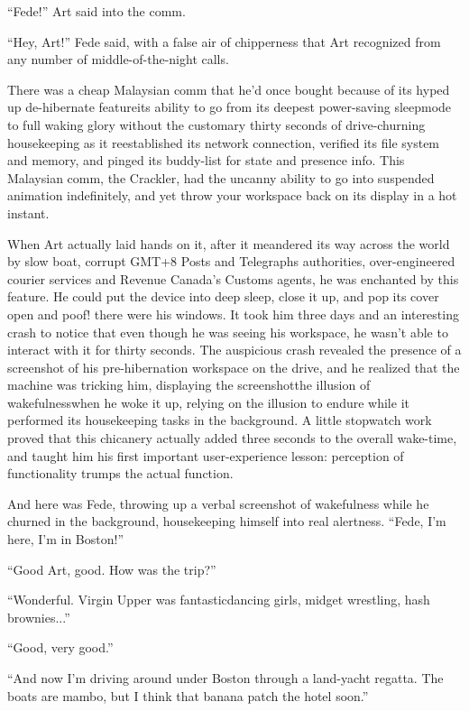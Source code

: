 “Fede!” Art said into the comm.

“Hey, Art!” Fede said, with a false air of chipperness that Art
recognized from any number of middle-of-the-night calls.

There was a cheap Malaysian comm that he’d once bought because of
its hyped up de-hibernate feature{\dash}its ability to go from its
deepest power-saving sleepmode to full waking glory without the
customary thirty seconds of drive-churning housekeeping as it
reestablished its network connection, verified its file system and
memory, and pinged its buddy-list for state and presence info. This
Malaysian comm, the Crackler, had the uncanny ability to go into
suspended animation indefinitely, and yet throw your workspace back
on its display in a hot instant.

When Art actually laid hands on it, after it meandered its way
across the world by slow boat, corrupt GMT+8 Posts and Telegraphs
authorities, over-engineered courier services and Revenue Canada’s
Customs agents, he was enchanted by this feature. He could put the
device into deep sleep, close it up, and pop its cover open and
poof! there were his windows. It took him three days and an
interesting crash to notice that even though he was seeing his
workspace, he wasn’t able to interact with it for thirty seconds.
The auspicious crash revealed the presence of a screenshot of his
pre-hibernation workspace on the drive, and he realized that the
machine was tricking him, displaying the screenshot{\dash}the illusion of
wakefulness{\dash}when he woke it up, relying on the illusion to endure
while it performed its housekeeping tasks in the background. A
little stopwatch work proved that this chicanery actually added
three seconds to the overall wake-time, and taught him his first
important user-experience lesson: perception of functionality
trumps the actual function.

And here was Fede, throwing up a verbal screenshot of wakefulness
while he churned in the background, housekeeping himself into real
alertness. “Fede, I’m here, I’m in Boston!”

“Good Art, good. How was the trip?”

“Wonderful. Virgin Upper was fantastic{\dash}dancing girls, midget
wres\-tling, hash brownies...”

“Good, very good.”

“And now I’m driving around under Boston through a land-yacht
regatta. The boats are mambo, but I think that banana patch the
hotel soon.”

